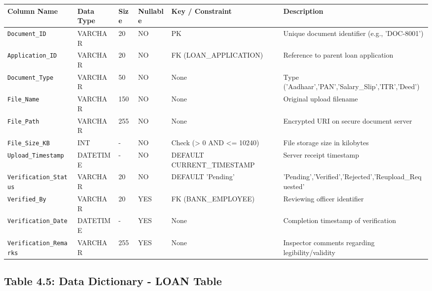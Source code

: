 \documentclass[12pt,a4paper,oneside]{report}
\begin{document}
\begin{table}[htbp]
\centering
\small
\begin{tabularx}{\textwidth}{p{2.5cm} X X X X X}
\toprule
\textbf{Column Name} & \textbf{Data Type} & \textbf{Size} & \textbf{Nullable} & \textbf{Key / Constraint} & \textbf{Description} \\
\midrule
\texttt{Document\_ID} & VARCHAR & 20 & NO & PK & Unique document identifier (e.g., 'DOC-8001') \\
\texttt{Application\_ID} & VARCHAR & 20 & NO & FK (LOAN\_APPLICATION) & Reference to parent loan application \\
\texttt{Document\_Type} & VARCHAR & 50 & NO & None & Type ('Aadhaar','PAN','Salary\_Slip','ITR','Deed') \\
\texttt{File\_Name} & VARCHAR & 150 & NO & None & Original upload filename \\
\texttt{File\_Path} & VARCHAR & 255 & NO & None & Encrypted URI on secure document server \\
\texttt{File\_Size\_KB} & INT & - & NO & Check (> 0 AND <= 10240) & File storage size in kilobytes \\
\texttt{Upload\_Timestamp} & DATETIME & - & NO & DEFAULT CURRENT\_TIMESTAMP & Server receipt timestamp \\
\texttt{Verification\_Status} & VARCHAR & 20 & NO & DEFAULT 'Pending' & 'Pending','Verified','Rejected','Reupload\_Requested' \\
\texttt{Verified\_By} & VARCHAR & 20 & YES & FK (BANK\_EMPLOYEE) & Reviewing officer identifier \\
\texttt{Verification\_Date} & DATETIME & - & YES & None & Completion timestamp of verification \\
\texttt{Verification\_Remarks} & VARCHAR & 255 & YES & None & Inspector comments regarding legibility/validity \\
\bottomrule
\end{tabularx}
\end{table}

\subsection{Table 4.5: Data Dictionary - LOAN Table}
\end{document}
